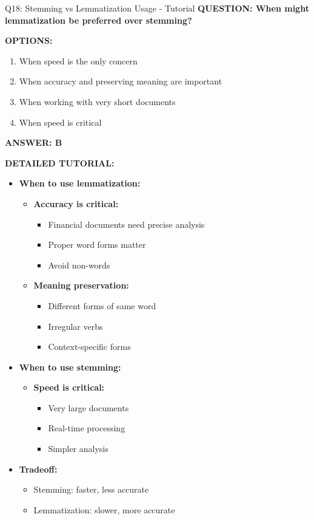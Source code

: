 \documentclass[8pt]{beamer}
\begin{document}
\begin{frame}{Q18: Stemming vs Lemmatization Usage - Tutorial}
	\fontsize{6.5}{7.5}\selectfont
	\textbf{QUESTION: When might lemmatization be preferred over stemming?}
	
	\vspace{0.1cm}
	\textbf{OPTIONS:}
	\begin{enumerate}
		\item When speed is the only concern
		\item When accuracy and preserving meaning are important
		\item When working with very short documents
		\item When speed is critical
	\end{enumerate}
	
	\vspace{0.1cm}
	\textcolor{myblue}{\textbf{ANSWER: B}}
	
	\vspace{0.1cm}
	\textbf{DETAILED TUTORIAL:}
	\begin{itemize}
		\item \textbf{When to use lemmatization:}
		\begin{itemize}
			\item \textbf{Accuracy is critical:}
			\begin{itemize}
				\item Financial documents need precise analysis
				\item Proper word forms matter
				\item Avoid non-words
			\end{itemize}
			\item \textbf{Meaning preservation:}
			\begin{itemize}
				\item Different forms of same word
				\item Irregular verbs
				\item Context-specific forms
			\end{itemize}
		\end{itemize}
		\item \textbf{When to use stemming:}
		\begin{itemize}
			\item \textbf{Speed is critical:}
			\begin{itemize}
				\item Very large documents
				\item Real-time processing
				\item Simpler analysis
			\end{itemize}
		\end{itemize}
		\item \textbf{Tradeoff:}
		\begin{itemize}
			\item Stemming: faster, less accurate
			\item Lemmatization: slower, more accurate
		\end{itemize}
	\end{itemize}
	

\end{frame}
\end{document}
